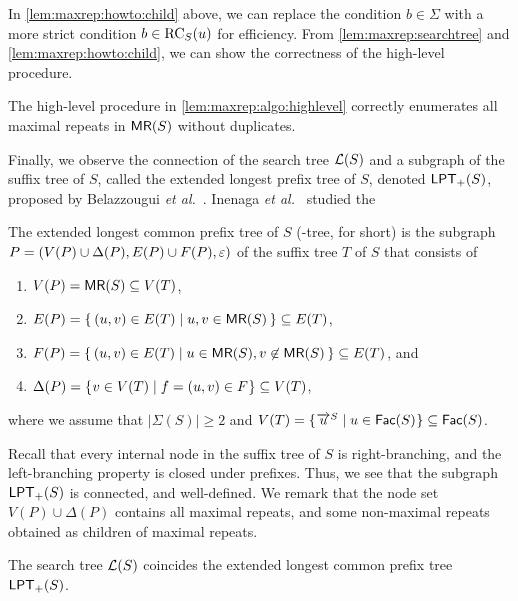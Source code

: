 In \cref{lem:maxrep:howto:child} above, we can replace the condition $b \in \Sigma$ with a more strict condition $b \in \mathrm{RC}_{S}(u)$ for efficiency.
From \cref{lem:maxrep:searchtree} and \cref{lem:maxrep:howto:child}, we can show the correctness of the high-level procedure. 

\begin{lemma}[correctness]\label{lem:maxrep:howto:child}
  The high-level procedure in \cref{lem:maxrep:algo:highlevel} correctly enumerates all maximal repeats in $\textsf{MR}(S)$ without duplicates. 
\end{lemma}

Finally, we observe the connection of the search tree $\mathcal{L}(S)$ and a subgraph of the suffix tree of $S$, called the extended longest prefix tree of $S$, denoted $\mathsf{LPT}_{+}(S)$, proposed by Belazzougui \textit{et al.}~\cite{belazzougui:nunial:gagie:prezza:raffinot2015composite}. Inenaga \textit{et al.}~\cite{inenaga:iwoca2024computing:maw} studied the 

\begin{definition}
The extended longest common prefix tree of $S$ (\LPTrm-tree, for short) is the subgraph $P = (V(P)\cup \Delta(P), E(P)\cup F(P), \varepsilon)$ of the suffix tree $T$ of $S$ that consists of 
\begin{enumerate}
\item $V(P) = \textsf{MR}(S) \subseteq V(T)$,  
\item $E(P) = \{\kern0.2em (u, v) \in E(T) \mid u, v \in \textsf{MR}(S) \kern0.2em\} \subseteq E(T)$,  
\item $F(P) = \{\kern0.2em (u, v) \in E(T) \mid u \in \textsf{MR}(S), v \not\in \textsf{MR}(S) \kern0.2em\} \subseteq E(T)$, and  
\item $\Delta(P) = \{\kern0.05em v \in V(T) \mid f = (u, v) \in F \kern0.05em\} \subseteq V(T)$,  
\end{enumerate}
where we assume that $|\Sigma(S)|\ge 2$ and $V(T) = \{\kern0.05em \overrightarrow{u}^{S} \mid u \in \mathsf{Fac}{(S)} \kern0.05em\} \subseteq \mathsf{Fac}{(S)}$. 
\end{definition}

Recall that every internal node in the suffix tree of $S$ is right-branching, and the left-branching property is closed under prefixes. Thus, we see that the subgraph $\mathsf{LPT}_{+}(S)$ is connected, and well-defined. 
We remark that the node set $V(P)\cup\Delta(P)$ contains all maximal repeats, and some non-maximal repeats obtained as children of maximal repeats.

\begin{lemma}\label{lem:lpt:character}
The search tree $\mathcal{L}(S)$ coincides the extended longest common prefix tree $\mathsf{LPT}_{+}(S)$. 
\end{lemma}

